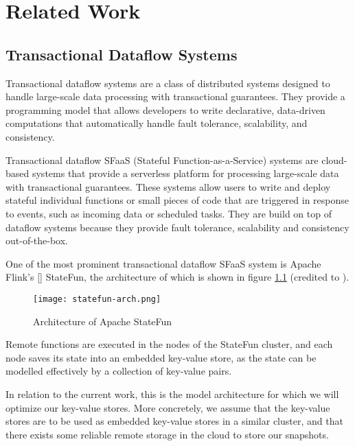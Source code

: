 
\chapter{Related Work}

\label{Chapter2-related-work}

\section{Transactional Dataflow Systems}

Transactional dataflow systems are a class of distributed systems designed to handle large-scale data processing with transactional guarantees.
They provide a programming model that allows developers to write declarative, data-driven computations that automatically handle fault tolerance, scalability, and consistency.

Transactional dataflow SFaaS (Stateful Function-as-a-Service) systems are cloud-based systems that provide a serverless platform for processing large-scale data with transactional guarantees.
These systems allow users to write and deploy stateful individual functions or small pieces of code that are triggered in response to events, such as incoming data or scheduled tasks. They are build on top of dataflow systems because they provide fault tolerance, scalability and consistency out-of-the-box.

One of the most prominent transactional dataflow SFaaS system is Apache Flink's [\cite{apache-flink}] StateFun, the architecture of which is shown in figure \ref{fig:statefun-arch} (credited to \cite{transactions-serverless-functions-leveraging-stateful-dataflows}).

\begin{figure}[h]
    \centering
    \texttt{[image: statefun-arch.png]}
    \caption{Architecture of Apache StateFun}
    \label{fig:statefun-arch}
\end{figure}

Remote functions are executed in the nodes of the StateFun cluster, and each node saves its state into an embedded key-value store, as the state can be modelled effectively by a collection of key-value pairs.

In relation to the current work, this is the model architecture for which we will optimize our key-value stores. More concretely, we assume that the key-value stores are to be used as embedded key-value stores in a similar cluster, and that there exists some reliable remote storage in the cloud to store our snapshots.

